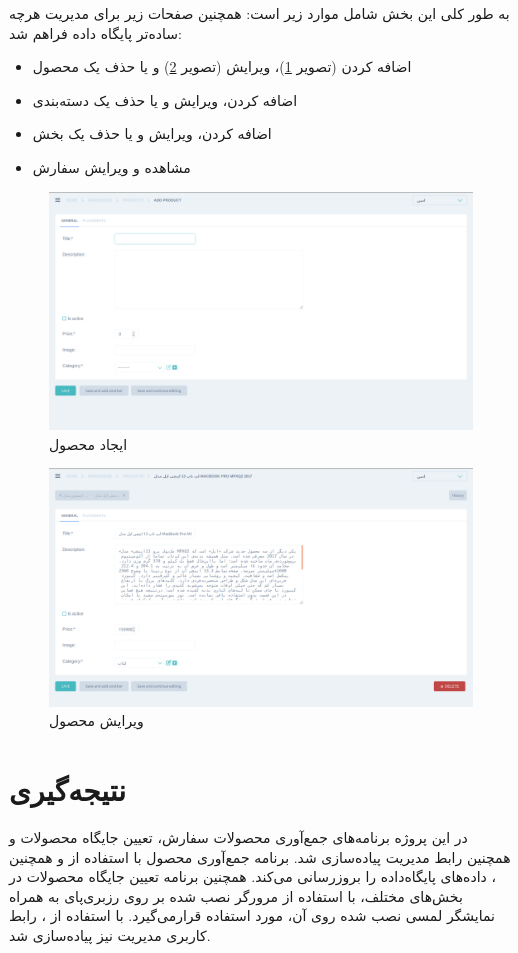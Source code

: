 به طور کلی این بخش شامل موارد زیر است:
همچنین صفحات زیر برای مدیریت هرچه ساده‌تر پایگاه داده فراهم شد:
\begin{itemize}
   	\item اضافه کردن (تصویر \ref{new-product})، ویرایش (تصویر \ref{edit-product}) و یا حذف یک محصول
   	\item اضافه کردن، ویرایش و یا حذف یک دسته‌بندی
   	\item اضافه کردن، ویرایش و یا حذف یک بخش
   	\item مشاهده و ویرایش سفارش
\end{itemize}


\begin{figure}[t!]
    \centering
    \includegraphics[scale=0.25]{figures/new-product.png}
    \caption{ایجاد محصول}
    \label{new-product}
\end{figure}

\begin{figure}[t!]
    \centering
    \includegraphics[scale=0.25]{figures/edit-product.png}
    \caption{ویرایش محصول}
    \label{edit-product}
\end{figure}


\section{نتیجه‌گیری}
در این پروژه برنامه‌های جمع‌آوری محصولات سفارش، تعیین جایگاه محصولات و همچنین رابط مدیریت پیاده‌سازی شد. برنامه جمع‌آوری محصول با استفاده از  و همچنین ، داده‌های پایگاه‌داده را بروزرسانی می‌کند. همچنین برنامه تعیین جایگاه محصولات در بخش‌های مختلف، با استفاده از مرورگر نصب شده بر روی رزبری‌پای  به همراه نمایشگر لمسی نصب شده روی آن،  مورد استفاده قرارمی‌گیرد. با استفاده از ، رابط کاربری مدیریت نیز پیاده‌سازی شد.
